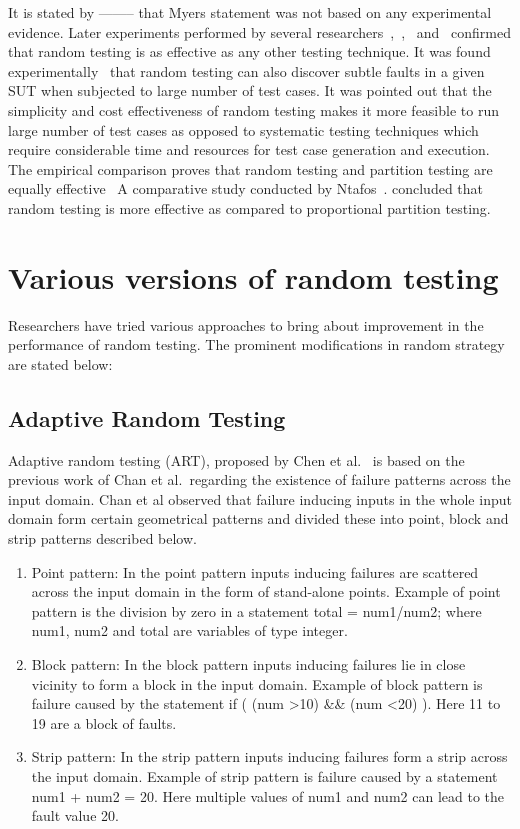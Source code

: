 {It is stated by -------- that Myers statement was not based on any experimental evidence. Later experiments performed by several researchers~\cite{hamlet1994},~\cite{Ciupa2008},~\cite{leitner2007efficient} and~\cite{Duran1981} confirmed that random testing is as effective as any other testing technique. It was found experimentally~\cite{Duran1981} that random testing can also discover subtle faults in a given SUT when subjected to large number of test cases. It was pointed out that the simplicity and cost effectiveness of random testing makes it more feasible to run large number of test cases as opposed to systematic testing techniques which require considerable time and resources for test case generation and execution. The empirical comparison proves that random testing and partition testing are equally effective~\cite{hamlet1990} A comparative study conducted by Ntafos~\cite{ntafos1998random}. concluded that random testing is more effective as compared to proportional partition testing.


\section{Various versions of random testing}
Researchers have tried various approaches to bring about improvement in the performance of random testing. The prominent modifications in random strategy are stated below:

\subsection{Adaptive Random Testing}
Adaptive random testing (ART), proposed by Chen et al.~\cite{Chen2008} is based on the previous work of Chan et al.~\cite{Chan1996}regarding the existence of failure patterns across the input domain. Chan et al observed that failure inducing inputs in the whole input domain form certain geometrical patterns and divided these into point, block and strip patterns described below.

\begin{enumerate}
\item Point pattern: In the point pattern inputs inducing failures are scattered across the input domain in the form of stand-alone points. Example of point pattern is the division by zero in a statement total = num1/num2; where num1, num2 and total are variables of type integer.
\item Block pattern: In the block pattern inputs inducing failures lie in close vicinity to form a block in the input domain. Example of block pattern is failure caused by the statement if ( (num \textgreater 10) \&\& (num \textless 20) ). Here 11 to 19 are a block of faults.
\item Strip pattern: In the strip pattern inputs inducing failures form a strip across the input domain. Example of strip pattern is failure caused by a statement num1 + num2 = 20. Here multiple values of num1 and num2 can lead to the fault value 20. 
\end{enumerate}

}
